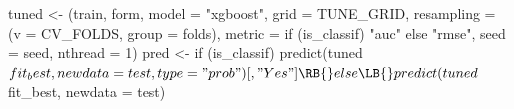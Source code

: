 tuned <- (train, form, model = "xgboost", grid = TUNE_GRID,
              resampling = (v = CV_FOLDS, group = folds),
              metric = if (is_classif) "auc" else "rmse", seed = seed, nthread = 1)
pred <- if (is_classif) \LB{}
  predict(tuned$fit_best, newdata = test, type = "prob")[, "Yes"]
\RB{} else \LB{}
  predict(tuned$fit_best, newdata = test)
\RB{}
